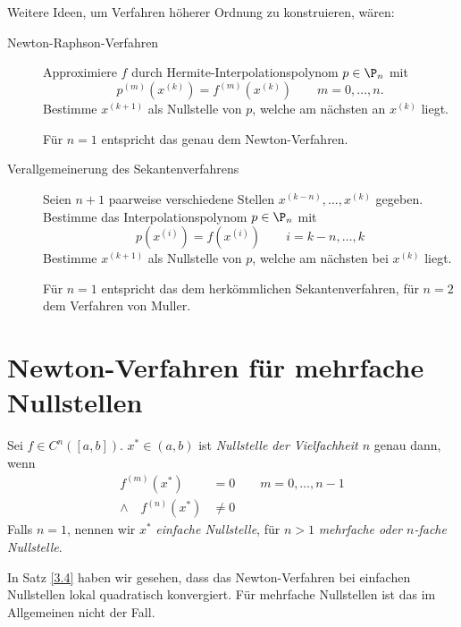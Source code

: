\documentclass[11pt]{scrbook}
\begin{document}
Weitere Ideen, um Verfahren höherer Ordnung zu konstruieren, wären:
\begin{description}
	\item[Newton-Raphson-Verfahren]
		Approximiere $f$ durch Hermite-Interpolationspolynom $p\in \P_n$ mit 
		\[
			p^{(m)}(x^{(k)}) = f^{(m)}(x^{(k)}) \qquad m=0,\dotsc,n.
		\]
		Bestimme $x^{(k+1)}$ als Nullstelle von $p$, welche am nächsten an $x^{(k)}$ liegt.

		Für $n=1$ entspricht das genau dem Newton-Verfahren.
	\item[Verallgemeinerung des Sekantenverfahrens]
		Seien $n+1$ paarweise verschiedene Stellen $x^{(k-n)}, \dotsc, x^{(k)}$ gegeben.
		Bestimme das Interpolationspolynom $p\in \P_n$ mit
		\[
			p(x^{(i)}) = f(x^{(i)}) \qquad i=k-n,\dotsc,k
		\]
		Bestimme $x^{(k+1)}$ als Nullstelle von $p$, welche am nächsten bei $x^{(k)}$ liegt.

		Für $n=1$ entspricht das dem herkömmlichen Sekantenverfahren, für $n=2$ dem Verfahren von Muller.
\end{description}


\section{Newton-Verfahren für mehrfache Nullstellen}

\begin{df} \label{3.14}
	Sei $f\in C^n ([a,b])$.
	$x^* \in (a,b)$ ist \emph{Nullstelle der Vielfachheit $n$} genau dann, wenn
	\begin{align*}
		f^{(m)}(x^*) &= 0 \qquad m=0,\dotsc,n-1 \\
		\land\quad f^{(n)}(x^*) &\neq 0
	\end{align*}
	Falls $n=1$, nennen wir $x^*$ \emph{einfache Nullstelle}, für $n>1$ \emph{mehrfache oder $n$-fache Nullstelle}.
\end{df}

\begin{nt*}
	In Satz \ref{3.4} haben wir gesehen, dass das Newton-Verfahren bei einfachen Nullstellen lokal quadratisch konvergiert.
	Für mehrfache Nullstellen ist das im Allgemeinen nicht der Fall.
\end{nt*}
\end{document}
